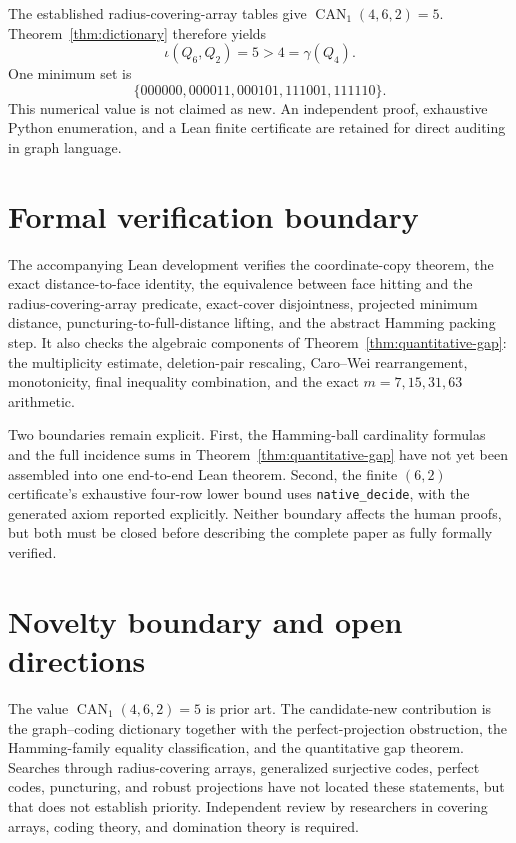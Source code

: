 \documentclass[11pt]{article}
\theoremstyle{definition}
\theoremstyle{remark}
\newcommand{\CAN}{\operatorname{CAN}}
\begin{document}
The established radius-covering-array tables give
$\CAN_1(4,6,2)=5$.  Theorem~\ref{thm:dictionary} therefore yields
\[
  \iota(Q_6,Q_2)=5>4=\gamma(Q_4).
\]
One minimum set is
\[
 \{000000,000011,000101,111001,111110\}.
\]
This numerical value is not claimed as new.  An independent proof, exhaustive
Python enumeration, and a Lean finite certificate are retained for direct
auditing in graph language.

\section{Formal verification boundary}

The accompanying Lean development verifies the coordinate-copy theorem, the
exact distance-to-face identity, the equivalence between face hitting and the
radius-covering-array predicate, exact-cover disjointness, projected minimum
distance, puncturing-to-full-distance lifting, and the abstract Hamming packing
step.  It also checks the algebraic components of
Theorem~\ref{thm:quantitative-gap}: the multiplicity estimate, deletion-pair
rescaling, Caro--Wei rearrangement, monotonicity, final inequality combination,
and the exact $m=7,15,31,63$ arithmetic.

Two boundaries remain explicit.  First, the Hamming-ball cardinality formulas
and the full incidence sums in Theorem~\ref{thm:quantitative-gap} have not yet
been assembled into one end-to-end Lean theorem.  Second, the finite $(6,2)$
certificate's exhaustive four-row lower bound uses \texttt{native\_decide},
with the generated axiom reported explicitly.  Neither boundary affects the
human proofs, but both must be closed before describing the complete paper as
fully formally verified.

\section{Novelty boundary and open directions}

The value $\CAN_1(4,6,2)=5$ is prior art.  The candidate-new contribution is
the graph--coding dictionary together with the perfect-projection obstruction,
the Hamming-family equality classification, and the quantitative gap theorem.
Searches through radius-covering arrays, generalized surjective codes, perfect
codes, puncturing, and robust projections have not located these statements,
but that does not establish priority.  Independent review by researchers in
covering arrays, coding theory, and domination theory is required.
\end{document}
